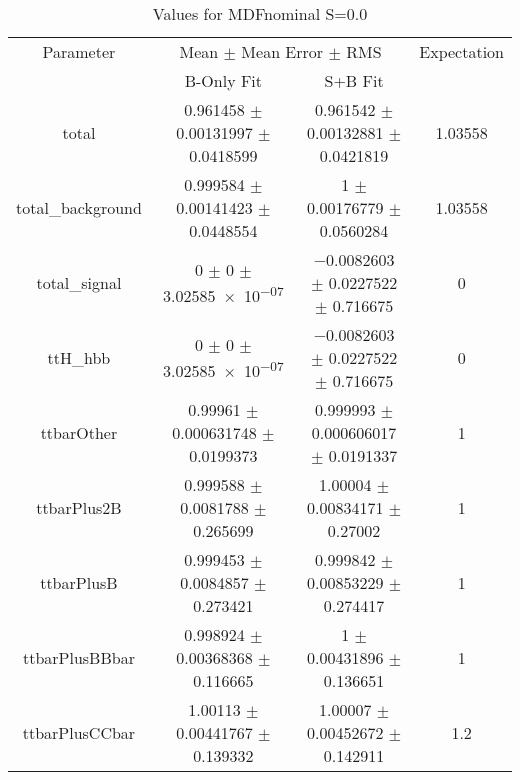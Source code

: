 \begin{table}
\centering
\caption{Values for MDFnominal S=0.0}
\begin{tabular}{cccc}
\toprule
Parameter & \multicolumn{2}{c}{Mean $\pm$ Mean Error $\pm$ RMS} & Expectation\\
 & B-Only Fit & S+B Fit & \\
\midrule
total & \num{0.961458} $\pm$ \num{0.00131997} $\pm$ \num{0.0418599} & \num{0.961542} $\pm$ \num{0.00132881} $\pm$ \num{0.0421819} & \num{1.03558}\\
total\_background & \num{0.999584} $\pm$ \num{0.00141423} $\pm$ \num{0.0448554} & \num{1} $\pm$ \num{0.00176779} $\pm$ \num{0.0560284} & \num{1.03558}\\
total\_signal & \num{0} $\pm$ \num{0} $\pm$ \num{3.02585e-07} & \num{-0.0082603} $\pm$ \num{0.0227522} $\pm$ \num{0.716675} & \num{0}\\
ttH\_hbb & \num{0} $\pm$ \num{0} $\pm$ \num{3.02585e-07} & \num{-0.0082603} $\pm$ \num{0.0227522} $\pm$ \num{0.716675} & \num{0}\\
ttbarOther & \num{0.99961} $\pm$ \num{0.000631748} $\pm$ \num{0.0199373} & \num{0.999993} $\pm$ \num{0.000606017} $\pm$ \num{0.0191337} & \num{1}\\
ttbarPlus2B & \num{0.999588} $\pm$ \num{0.0081788} $\pm$ \num{0.265699} & \num{1.00004} $\pm$ \num{0.00834171} $\pm$ \num{0.27002} & \num{1}\\
ttbarPlusB & \num{0.999453} $\pm$ \num{0.0084857} $\pm$ \num{0.273421} & \num{0.999842} $\pm$ \num{0.00853229} $\pm$ \num{0.274417} & \num{1}\\
ttbarPlusBBbar & \num{0.998924} $\pm$ \num{0.00368368} $\pm$ \num{0.116665} & \num{1} $\pm$ \num{0.00431896} $\pm$ \num{0.136651} & \num{1}\\
ttbarPlusCCbar & \num{1.00113} $\pm$ \num{0.00441767} $\pm$ \num{0.139332} & \num{1.00007} $\pm$ \num{0.00452672} $\pm$ \num{0.142911} & \num{1.2}\\
\bottomrule
\end{tabular}
\end{table}